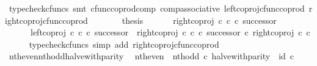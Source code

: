\begin{isabellebody}
\ {\isacharparenleft}{\kern0pt}typecheck{\isacharunderscore}{\kern0pt}cfuncs{\isacharcomma}{\kern0pt}\ smt\ cfunc{\isacharunderscore}{\kern0pt}coprod{\isacharunderscore}{\kern0pt}comp\ comp{\isacharunderscore}{\kern0pt}associative{}\ left{\isacharunderscore}{\kern0pt}coproj{\isacharunderscore}{\kern0pt}cfunc{\isacharunderscore}{\kern0pt}coprod\ right{\isacharunderscore}{\kern0pt}coproj{\isacharunderscore}{\kern0pt}cfunc{\isacharunderscore}{\kern0pt}coprod{\isacharparenright}{\kern0pt}\isanewline
\ \ \ \ \isamarkupfalse%
\ \isamarkupfalse%
\ {\isacharquery}{\kern0pt}thesis\isacommand{{\isachardot}{\kern0pt}}\isamarkupfalse%
\isanewline
\ \ \isamarkupfalse%
\isanewline
\isanewline
\ \ \isamarkupfalse%
\ {\isachardoublequoteopen}right{\isacharunderscore}{\kern0pt}coproj\ {\isasymnat}\isactrlsub c\ {\isasymnat}\isactrlsub c\ {\isasymcirc}\isactrlsub c\ successor\ {\isacharequal}{\kern0pt}\isanewline
\ \ \ \ \ \ {\isacharparenleft}{\kern0pt}left{\isacharunderscore}{\kern0pt}coproj\ {\isasymnat}\isactrlsub c\ {\isasymnat}\isactrlsub c\ {\isasymcirc}\isactrlsub c\ successor{\isacharparenright}{\kern0pt}\ {\isasymamalg}\ {\isacharparenleft}{\kern0pt}right{\isacharunderscore}{\kern0pt}coproj\ {\isasymnat}\isactrlsub c\ {\isasymnat}\isactrlsub c\ {\isasymcirc}\isactrlsub c\ successor{\isacharparenright}{\kern0pt}\ {\isasymcirc}\isactrlsub c\ right{\isacharunderscore}{\kern0pt}coproj\ {\isasymnat}\isactrlsub c\ {\isasymnat}\isactrlsub c{\isachardoublequoteclose}\isanewline
\ \ \ \ \isamarkupfalse%
\ {\isacharparenleft}{\kern0pt}typecheck{\isacharunderscore}{\kern0pt}cfuncs{\isacharcomma}{\kern0pt}\ simp\ add{\isacharcolon}{\kern0pt}\ right{\isacharunderscore}{\kern0pt}coproj{\isacharunderscore}{\kern0pt}cfunc{\isacharunderscore}{\kern0pt}coprod{\isacharparenright}{\kern0pt}\isanewline
{}\isamarkupfalse%
%
\endisatagproof
{\isafoldproof}%
%
\isadelimproof
\isanewline
%
\endisadelimproof
\isanewline
{}\isamarkupfalse%
\ nth{\isacharunderscore}{\kern0pt}even{\isacharunderscore}{\kern0pt}nth{\isacharunderscore}{\kern0pt}odd{\isacharunderscore}{\kern0pt}halve{\isacharunderscore}{\kern0pt}with{\isacharunderscore}{\kern0pt}parity{\isacharcolon}{\kern0pt}\isanewline
\ \ {\isachardoublequoteopen}{\isacharparenleft}{\kern0pt}nth{\isacharunderscore}{\kern0pt}even\ {\isasymamalg}\ nth{\isacharunderscore}{\kern0pt}odd{\isacharparenright}{\kern0pt}\ {\isasymcirc}\isactrlsub c\ halve{\isacharunderscore}{\kern0pt}with{\isacharunderscore}{\kern0pt}parity\ {\isacharequal}{\kern0pt}\ id\ {\isasymnat}\isactrlsub c{\isachardoublequoteclose}\isanewline

\end{isabellebody}
